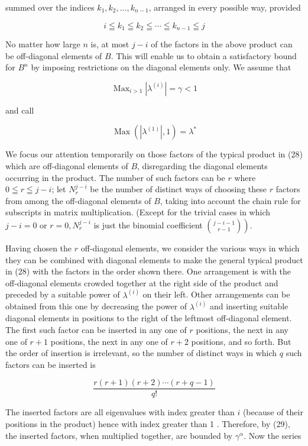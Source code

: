 \documentclass[10pt]{article}
\begin{document}
summed over the indices \(k_{1}, k_{2}, \ldots, k_{n-1}\), arranged in every possible way, provided

\[
i \leqq k_{1} \leqq k_{2} \leqq \cdots \leqq k_{n-1} \leqq j
\]

No matter how large \(n\) is, at most \(j-i\) of the factors in the above product can be off-diagonal elements of \(B\). This will enable us to obtain a satisfactory bound for \(B^{n}\) by imposing restrictions on the diagonal elements only. We assume that

\[
\operatorname{Max}_{i>1}\left|\lambda^{(i)}\right|=\gamma<1
\]

and call

\[
\operatorname{Max}\left(\left|\lambda^{(1)}\right|, 1\right)=\lambda^{*}
\]

We focus our attention temporarily on those factors of the typical product in (28) which are off-diagonal elements of \(B\), disregarding the diagonal elements occurring in the product. The number of such factors can be \(r\) where \(0 \leqq r \leqq j-i\); let \(N_{r}^{j-i}\) be the number of distinct ways of choosing these \(r\) factors from among the off-diagonal elements of \(B\), taking into account the chain rule for subscripts in matrix multiplication. (Except for the trivial cases in which \(j-i=0\) or \(r=0, N_{r}^{j-i}\) is just the binomial coefficient \(\left.\binom{j-i-1}{r-1}\right)\).

Having chosen the \(r\) off-diagonal elements, we consider the various ways in which they can be combined with diagonal elements to make the general typical product in (28) with the factors in the order shown there. One arrangement is with the off-diagonal elements crowded together at the right side of the product and preceded by a suitable power of \(\lambda^{(i)}\) on their left. Other arrangements can be obtained from this one by decreasing the power of \(\lambda^{(i)}\) and inserting suitable diagonal elements in positions to the right of the leftmost off-diagonal element. The first such factor can be inserted in any one of \(r\) positions, the next in any one of \(r+1\) positions, the next in any one of \(r+2\) positions, and so forth. But the order of insertion is irrelevant, so the number of distinct ways in which \(q\) such factors can be inserted is

\[
\frac{r(r+1)(r+2) \cdots(r+q-1)}{q!}
\]

The inserted factors are all eigenvalues with index greater than \(i\) (because of their positions in the product) hence with index greater than 1 . Therefore, by (29), the inserted factors, when multiplied together, are bounded by \(\gamma^{\alpha}\). Now the series
\end{document}

